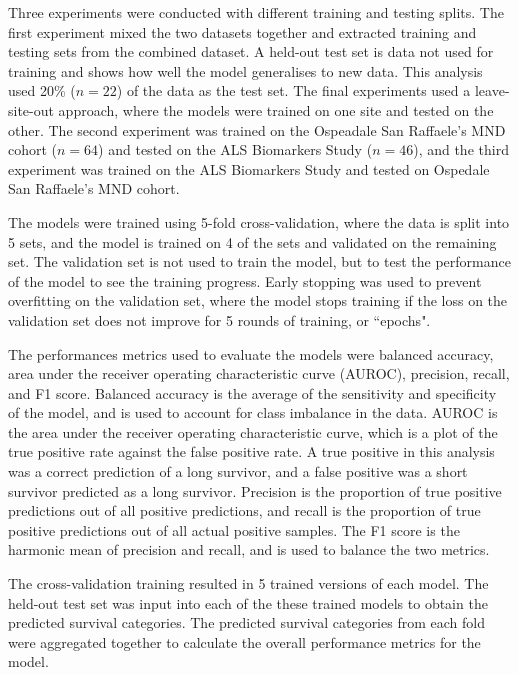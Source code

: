Three experiments were conducted with different training and testing splits.
The first experiment mixed the two datasets together and extracted training and testing sets from the combined dataset.
A held-out test set is data not used for training and shows how well the model generalises to new data.
This analysis used 20\% ($n=22$) of the data as the test set.
The final experiments used a leave-site-out approach, where the models were trained on one site and tested on the other.
The second experiment was trained on the Ospeadale San Raffaele's MND cohort ($n=64$) and tested on the ALS Biomarkers Study ($n=46$), and the third experiment was trained on the ALS Biomarkers Study and tested on Ospedale San Raffaele's MND cohort.

The models were trained using 5-fold cross-validation, where the data is split into 5 sets, and the model is trained on 4 of the sets and validated on the remaining set.
The validation set is not used to train the model, but to test the performance of the model to see the training progress.
Early stopping was used to prevent overfitting on the validation set, where the model stops training if the loss on the validation set does not improve for 5 rounds of training, or ``epochs".

The performances metrics used to evaluate the models were balanced accuracy, area under the receiver operating characteristic curve (AUROC), precision, recall, and F1 score.
Balanced accuracy is the average of the sensitivity and specificity of the model, and is used to account for class imbalance in the data.
AUROC is the area under the receiver operating characteristic curve, which is a plot of the true positive rate against the false positive rate.
A true positive in this analysis was a correct prediction of a long survivor, and a false positive was a short survivor predicted as a long survivor.
Precision is the proportion of true positive predictions out of all positive predictions, and recall is the proportion of true positive predictions out of all actual positive samples.
The F1 score is the harmonic mean of precision and recall, and is used to balance the two metrics.

The cross-validation training resulted in 5 trained versions of each model.
The held-out test set was input into each of the these trained models to obtain the predicted survival categories.
The predicted survival categories from each fold were aggregated together to calculate the overall performance metrics for the model.



